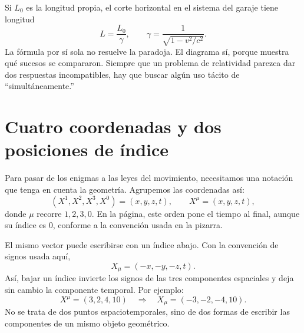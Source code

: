 Si \(L_0\) es la longitud propia, el corte horizontal en el sistema del garaje tiene longitud
\begin{equation}
L=\frac{L_0}{\gamma},
\qquad
\gamma=\frac{1}{\sqrt{1-v^2/c^2}}.
\end{equation}
La fórmula por sí sola no resuelve la paradoja. El diagrama sí, porque muestra qué sucesos se compararon. Siempre que un problema de relatividad parezca dar dos respuestas incompatibles, hay que buscar algún uso tácito de ``simultáneamente.''

\section{Cuatro coordenadas y dos posiciones de índice}

Para pasar de los enigmas a las leyes del movimiento, necesitamos una notación que tenga en cuenta la geometría. Agrupemos las coordenadas así:
\begin{equation}
(X^1,X^2,X^3,X^0)=(x,y,z,t),
\qquad X^\mu=(x,y,z,t),
\end{equation}
donde \(\mu\) recorre \(1,2,3,0\). En la página, este orden pone el tiempo al final, aunque su índice es \(0\), conforme a la convención usada en la pizarra.

\begin{classroomqa}\end{classroomqa}

El mismo vector puede escribirse con un índice abajo. Con la convención de signos usada aquí,
\begin{equation}
X_\mu=(-x,-y,-z,t).
\end{equation}
Así, bajar un índice invierte los signos de las tres componentes espaciales y deja sin cambio la componente temporal. Por ejemplo:
\begin{equation}
X^\mu=(3,2,4,10)
\quad\Longrightarrow\quad
X_\mu=(-3,-2,-4,10).
\end{equation}
No se trata de dos puntos espaciotemporales, sino de dos formas de escribir las componentes de un mismo objeto geométrico.

\begin{classroomqa}\end{classroomqa}

